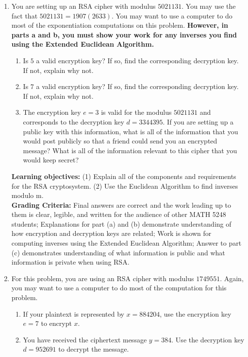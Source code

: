 \documentclass[12pt]{article}
\begin{document}
\begin{enumerate}


\item You are setting up an RSA cipher with modulus $5021131$.  You may use the fact that $5021131 = 1907(2633)$.  You may want to use a computer to do most of the exponentiation computations on this problem. {\bf However, in parts a and b,  you must show your work for any inverses you find using the Extended Euclidean Algorithm. }
\begin{enumerate}
\item Is $5$ a valid encryption key?  If so, find the corresponding decryption key.  If not, explain why not.

\item Is $7$ a valid encryption key?  If so, find the corresponding decryption key.  If not, explain why not.

\item The encryption key $e = 3$ is valid for the modulus $5021131$ and corresponds to the decryption key $d = 3344395$.  If you are setting up a public key with this information, what is all of the information that you would post publicly so that a friend could send you an encrypted message?  What is all of the information relevant to this cipher that you would keep secret?
\end{enumerate}
{\bf Learning objectives:} (1) Explain all of the components and requirements for the RSA cryptosystem.  (2) Use the Euclidean Algorithm to find inverses modulo m. \\
{\bf Grading Criteria:} Final answers are correct and the work leading up to them is clear, legible, and written for the audience of other MATH 5248 students; Explanations for part (a) and (b) demonstrate understanding of how encryption and decryption keys are related; Work is shown for computing inverses using the Extended Euclidean Algorithm; Answer to part (c) demonstrates understanding of what information is public and what information is private when using RSA. 


\item For this problem, you are using an RSA cipher with modulus $1749551$.  Again, you may want to use a computer to do most of the computation for this problem. \\
\begin{enumerate}
\item If your plaintext is represented by $x = 884204$, use the encryption key $e = 7$ to encrypt $x$.
\item You have received the ciphertext message $y = 384$.  Use the decryption key $d =952691$ to decrypt the message.  


\end{enumerate}
\end{enumerate}
\end{document}

